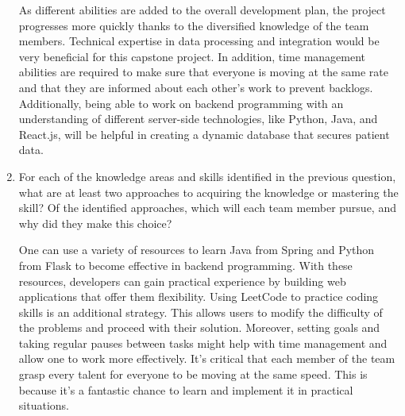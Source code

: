\documentclass[12pt]{article}
\begin{document}
\begin{enumerate}
  As different abilities are added to the overall development plan, the project progresses more quickly thanks to the diversified knowledge of the team members. Technical expertise in data processing and integration would be very beneficial for this capstone project. In addition, time management abilities are required to make sure that everyone is moving at the same rate and that they are informed about each other's work to prevent backlogs. Additionally, being able to work on backend programming with an understanding of different server-side technologies, like Python, Java, and React.js, will be helpful in creating a dynamic database that secures patient data. 

  \item For each of the knowledge areas and skills identified in the previous
  question, what are at least two approaches to acquiring the knowledge or
  mastering the skill?  Of the identified approaches, which will each team
  member pursue, and why did they make this choice?

  One can use a variety of resources to learn Java from Spring and Python from Flask to become effective in backend programming. With these resources, developers can gain practical experience by building web applications that offer them flexibility. Using LeetCode to practice coding skills is an additional strategy. This allows users to modify the difficulty of the problems and proceed with their solution. Moreover, setting goals and taking regular pauses between tasks might help with time management and allow one to work more effectively. It's critical that each member of the team grasp every talent for everyone to be moving at the same speed. This is because it's a fantastic chance to learn and implement it in practical situations. 

\end{enumerate}
\end{document}
